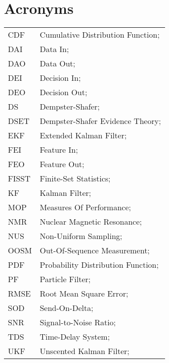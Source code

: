 \section*{Acronyms}
\begin{longtable}{ll}
	CDF			& Cumulative Distribution Function; \\
	DAI			& Data In; \\
	DAO			& Data Out; \\
	DEI			& Decision In; \\
	DEO 		& Decision Out; \\
	DS			& Dempster-Shafer; \\
	DSET 		& Dempster-Shafer Evidence Theory; \\		
	EKF			& Extended Kalman Filter; \\
	FEI			& Feature In; \\
	FEO			& Feature Out; \\
	FISST		& Finite-Set Statistics; \\
	KF 			& Kalman Filter; \\
	MOP 		& Measures Of Performance; \\
	NMR 		& Nuclear Magnetic Resonance; \\
	NUS 		& Non-Uniform Sampling; \\ 
	OOSM 		& Out-Of-Sequence Measurement; \\
	PDF         & Probability Distribution Function; \\
	PF 			& Particle Filter; \\
	RMSE		& Root Mean Square Error; \\
	SOD			& Send-On-Delta; \\
	SNR			& Signal-to-Noise Ratio; \\
	TDS			& Time-Delay System; \\
	UKF			& Unscented Kalman Filter; \\
\end{longtable}


